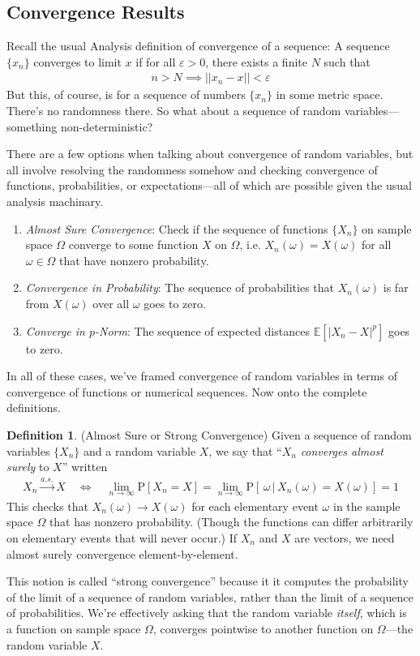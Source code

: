 \documentclass[12pt]{article}
\theoremstyle{plain}
\theoremstyle{definition}
\newtheorem{defn}[thm]{Definition}
\theoremstyle{remark}
\newcommand{\limn}{\lim_{n\rightarrow\infty}}
\newcommand{\Prb}{\mathrm{P}}
\newcommand{\ra}{\rightarrow}
\newcommand{\E}{\mathbb{E}}
\newcommand{\asto}{\xrightarrow{a.s.}}
\begin{document}
\subsection{Convergence Results}

Recall the usual Analysis definition of convergence of a sequence: A
sequence $\{x_n\}$ converges to limit $x$ if for all $\varepsilon> 0$,
there exists a finite $N$ such that
\begin{align*}
  n > N \implies ||x_n - x|| < \varepsilon
\end{align*}
But this, of course, is for a sequence of numbers $\{x_n\}$ in some
metric space. There's no randomness there. So what about a sequence of
random variables---something non-deterministic?

There are a few options when talking about convergence of random
variables, but all involve resolving the randomness somehow and checking
convergence of functions, probabilities, or expectations---all of which
are possible given the usual analysis machinary.
\begin{enumerate}
  \item \emph{Almost Sure Convergence}: Check if the sequence of
    functions $\{X_n\}$ on sample space $\Omega$ converge to some
    function $X$ on $\Omega$, i.e. $X_n(\omega)=X(\omega)$ for all
    $\omega\in\Omega$ that have nonzero probability.
  \item \emph{Convergence in Probability}: The sequence of probabilities
    that $X_n(\omega)$ is far from $X(\omega)$ over all $\omega$ goes to
    zero.
  \item \emph{Converge in $p$-Norm}: The sequence of expected distances
    $\E[|X_n-X|^p]$ goes to zero.
\end{enumerate}
In all of these cases, we've framed convergence of random variables in
terms of convergence of functions or numerical sequences. Now onto the
complete definitions.

\begin{defn}{(Almost Sure or Strong Convergence)}
Given a sequence of random variables $\{X_n\}$ and a random variable
$X$, we say that ``$X_n$ \emph{converges almost surely} to $X$'' written
\begin{align*}
  X_n\asto X
  \quad \iff \quad
  \limn \Prb[X_n = X]
  = \limn \Prb[\,\omega \,|\,X_n(\omega) = X(\omega)] = 1
\end{align*}
This checks that $X_n(\omega)\ra X(\omega)$ for each elementary event
$\omega$ in the sample space $\Omega$ that has nonzero probability.
(Though the functions can differ arbitrarily on elementary events that
will never occur.) If $X_n$ and $X$ are vectors, we need almost surely
convergence element-by-element.

This notion is called ``strong convergence'' because it it computes the
probability of the limit of a sequence of random variables, rather than
the limit of a sequence of probabilities. We're effectively asking that
the random variable \emph{itself}, which is a function on sample space
$\Omega$, converges pointwise to another function on $\Omega$---the
random variable $X$.
\end{defn}
\end{document}
